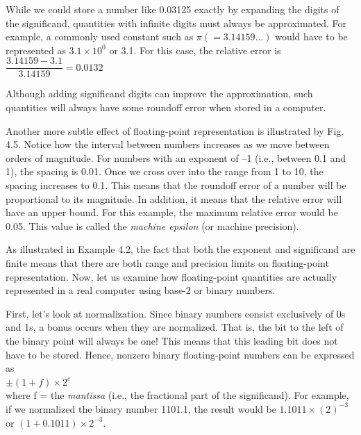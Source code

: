 \documentclass[../main.tex]{subfiles}
\begin{document}
\begin{example}
    While we could store a number like 0.03125 exactly by expanding the digits of the
    significand, quantities with infinite digits must always be approximated. For example, a
    commonly used constant such as $\pi (=3.14159\hdots)$ would have to be represented as $3.1\times 10^0$
    or 3.1. For this case, the relative error is\\

    $\dfrac{3.14159-3.1}{3.14159} = 0.0132$
    \newpage

    \noindent
    Although adding significand digits can improve the approximation, such quantities will
    always have some roundoff error when stored in a computer.
    
    Another more subtle effect of floating-point representation is illustrated by Fig. 4.5.
    Notice how the interval between numbers increases as we move between orders of magnitude.
    For numbers with an exponent of --1 (i.e., between 0.1 and 1), the spacing is 0.01.
    Once we cross over into the range from 1 to 10, the spacing increases to 0.1. This means
    that the roundoff error of a number will be proportional to its magnitude. In addition, it
    means that the relative error will have an upper bound. For this example, the maximum
    relative error would be 0.05. This value is called the \emph{machine epsilon} (or machine
    precision).\\
\end{example}

As illustrated in Example 4.2, the fact that both the exponent and significand are finite
means that there are both range and precision limits on floating-point representation. Now,
let us examine how floating-point quantities are actually represented in a real computer
using base-2 or binary numbers.

First, let's look at normalization. Since binary numbers consist exclusively of 0s and
1s, a bonus occurs when they are normalized. That is, the bit to the left of the binary point
will always be one! This means that this leading bit does not have to be stored. Hence,
nonzero binary floating-point numbers can be expressed as\\

$\pm (1+f)\times 2^e$\\

\noindent
where f = the \emph{mantissa} (i.e., the fractional part of the significand). For example, if we normalized
the binary number 1101.1, the result would be $1.1011\times (2)^{-3}$ or $(1+0.1011)\times2^{-3}$.
\end{document}
